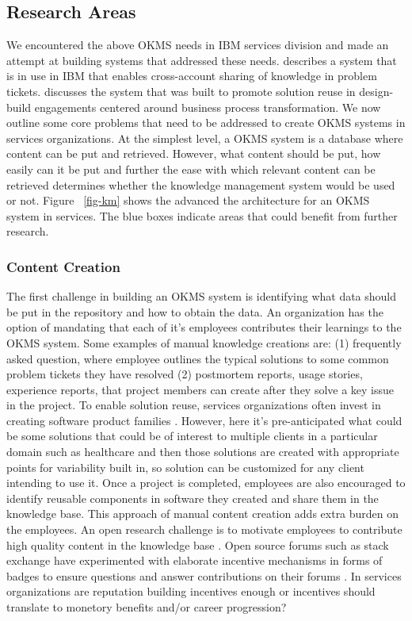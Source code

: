 \subsection{Research Areas}

We encountered the above OKMS needs in IBM services division and made an attempt at building systems that addressed these needs. \cite{} describes a system that is in use in IBM that enables cross-account sharing of knowledge in problem tickets. \cite{} discusses the system that was built to promote solution reuse in design-build engagements centered around business process transformation. We now outline some core problems that need to be addressed to create OKMS systems in services organizations. At the simplest level, a OKMS system is a database where content can be put and retrieved. However, what content should be put, how easily can it be put and further the ease with which relevant content can be retrieved determines whether the knowledge management system would be used or not. 
Figure ~\ref{fig-km} shows the advanced the architecture for an OKMS system in services. The blue boxes indicate areas that could benefit from further research. 

\subsubsection{Content Creation}

The first challenge in building an OKMS system is identifying what data should be put in the repository and how to obtain the data. An organization has the option of mandating that each of it's employees contributes their learnings to the OKMS system. Some examples of manual knowledge creations are: (1) frequently asked question, where employee outlines the typical solutions to some common problem tickets they have resolved (2) postmortem reports, usage stories, experience reports\cite{}, that project members can create after they solve a key issue in the project. To enable solution reuse, services organizations often invest in creating software product families \cite{}. However, here it's pre-anticipated what could be some solutions that could be of interest to multiple clients in a particular domain such as healthcare and then those solutions are created with appropriate points for variability built in, so solution can be customized for any client intending to use it.  Once a project is completed, employees are also encouraged to identify reusable components in software they created and share them in the knowledge base. This approach of manual content creation adds extra burden on the employees. An open research challenge is to motivate employees to contribute high quality content in the knowledge base \cite{}. Open source forums such as stack exchange have experimented with elaborate incentive mechanisms in forms of badges to ensure questions and answer contributions on their forums \cite{}. In services organizations are reputation building incentives enough or incentives should translate to monetory benefits and/or career progression? 

